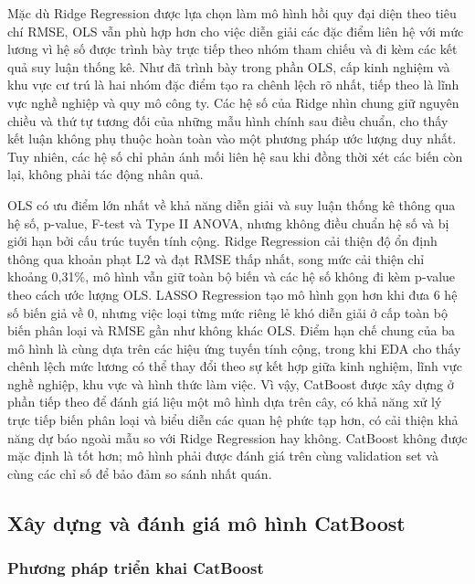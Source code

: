 Mặc dù Ridge Regression được lựa chọn làm mô hình hồi quy đại diện theo
tiêu chí RMSE, OLS vẫn phù hợp hơn cho việc diễn giải các đặc điểm liên
hệ với mức lương vì hệ số được trình bày trực tiếp theo nhóm tham chiếu
và đi kèm các kết quả suy luận thống kê. Như đã trình bày trong phần
OLS, cấp kinh nghiệm và khu vực cư trú là hai nhóm đặc điểm tạo ra chênh
lệch rõ nhất, tiếp theo là lĩnh vực nghề nghiệp và quy mô công ty. Các
hệ số của Ridge nhìn chung giữ nguyên chiều và thứ tự tương đối của
những mẫu hình chính sau điều chuẩn, cho thấy kết luận không phụ thuộc
hoàn toàn vào một phương pháp ước lượng duy nhất. Tuy nhiên, các hệ số
chỉ phản ánh mối liên hệ sau khi đồng thời xét các biến còn lại, không
phải tác động nhân quả.

OLS có ưu điểm lớn nhất về khả năng diễn giải và suy luận thống kê thông
qua hệ số, p-value, F-test và Type II ANOVA, nhưng không điều chuẩn hệ
số và bị giới hạn bởi cấu trúc tuyến tính cộng. Ridge Regression cải
thiện độ ổn định thông qua khoản phạt L2 và đạt RMSE thấp nhất, song mức
cải thiện chỉ khoảng 0,31\%, mô hình vẫn giữ toàn bộ biến và các hệ số
không đi kèm p-value theo cách ước lượng OLS. LASSO Regression tạo mô
hình gọn hơn khi đưa 6 hệ số biến giả về 0, nhưng việc loại từng mức
riêng lẻ khó diễn giải ở cấp toàn bộ biến phân loại và RMSE gần như
không khác OLS. Điểm hạn chế chung của ba mô hình là cùng dựa trên các
hiệu ứng tuyến tính cộng, trong khi EDA cho thấy chênh lệch mức lương có
thể thay đổi theo sự kết hợp giữa kinh nghiệm, lĩnh vực nghề nghiệp, khu
vực và hình thức làm việc. Vì vậy, CatBoost được xây dựng ở phần tiếp
theo để đánh giá liệu một mô hình dựa trên cây, có khả năng xử lý trực
tiếp biến phân loại và biểu diễn các quan hệ phức tạp hơn, có cải thiện
khả năng dự báo ngoài mẫu so với Ridge Regression hay không. CatBoost
không được mặc định là tốt hơn; mô hình phải được đánh giá trên cùng
validation set và cùng các chỉ số để bảo đảm so sánh nhất quán.

\subsection{Xây dựng và đánh giá mô hình
CatBoost}\label{nghi:xuxe2y-dux1ef1ng-vuxe0-ux111uxe1nh-giuxe1-muxf4-huxecnh-catboost}

\subsubsection{Phương pháp triển khai
CatBoost}\label{nghi:phux1b0ux1a1ng-phuxe1p-triux1ec3n-khai-catboost}

